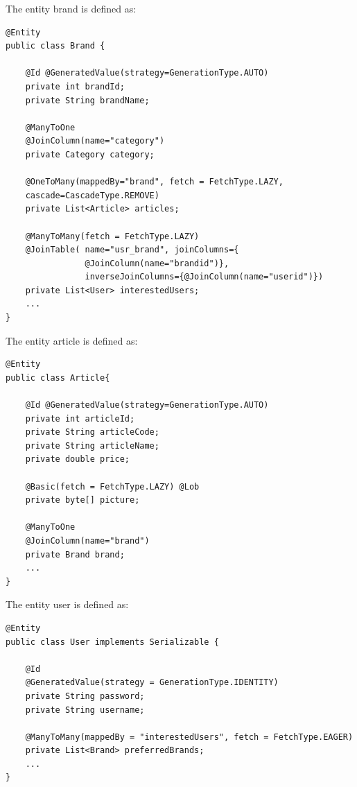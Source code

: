 The entity brand is defined as:  
\begin{lstlisting}[style=Java]
@Entity
public class Brand {

    @Id @GeneratedValue(strategy=GenerationType.AUTO)
    private int brandId;
    private String brandName;

    @ManyToOne
    @JoinColumn(name="category")
    private Category category;

    @OneToMany(mappedBy="brand", fetch = FetchType.LAZY,
    cascade=CascadeType.REMOVE)
    private List<Article> articles;

    @ManyToMany(fetch = FetchType.LAZY)
    @JoinTable( name="usr_brand", joinColumns={
                @JoinColumn(name="brandid")}, 
                inverseJoinColumns={@JoinColumn(name="userid")})
    private List<User> interestedUsers;
    ...
}
\end{lstlisting}
The entity article is defined as:  
\begin{lstlisting}[style=Java]
@Entity
public class Article{

    @Id @GeneratedValue(strategy=GenerationType.AUTO)
    private int articleId;
    private String articleCode;
    private String articleName;
    private double price;

    @Basic(fetch = FetchType.LAZY) @Lob
    private byte[] picture;

    @ManyToOne
    @JoinColumn(name="brand")
    private Brand brand;
    ...
}
\end{lstlisting}
The entity user is defined as:  
\begin{lstlisting}[style=Java]
@Entity
public class User implements Serializable {

    @Id
    @GeneratedValue(strategy = GenerationType.IDENTITY)
    private String password;
    private String username;

    @ManyToMany(mappedBy = "interestedUsers", fetch = FetchType.EAGER)
    private List<Brand> preferredBrands;
    ...
}
\end{lstlisting}